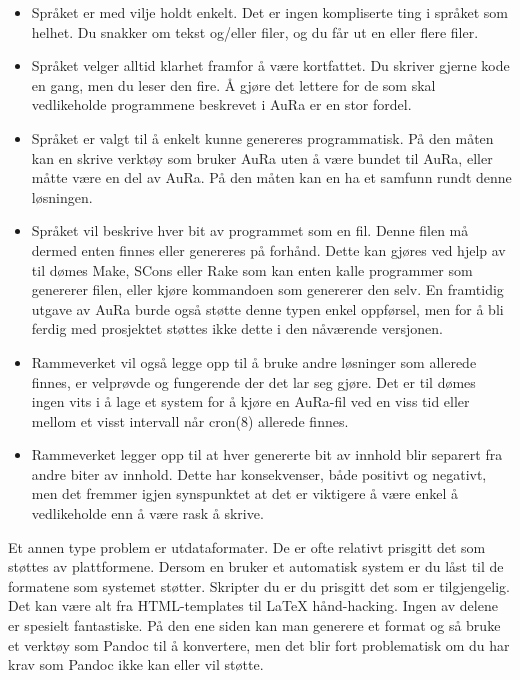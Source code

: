 \documentclass[11pt]{article}
\begin{document}
\begin{itemize}
\item Språket er med vilje holdt enkelt. Det er ingen kompliserte ting i språket som helhet. Du snakker om tekst og/eller filer, og du får ut en eller flere filer.
\item Språket velger alltid klarhet framfor å være kortfattet. Du skriver gjerne kode en gang, men du leser den fire. Å gjøre det lettere for de som skal vedlikeholde programmene beskrevet i AuRa er en stor fordel.
\item Språket er valgt til å enkelt kunne genereres programmatisk. På den måten kan en skrive verktøy som bruker AuRa uten å være bundet til AuRa, eller måtte være en del av AuRa. På den måten kan en ha et samfunn rundt denne løsningen.
\item Språket vil beskrive hver bit av programmet som en fil. Denne filen må dermed enten finnes eller genereres på forhånd. Dette kan gjøres ved hjelp av til dømes Make, SCons eller Rake som kan enten kalle programmer som genererer filen, eller kjøre kommandoen som genererer den selv. En framtidig utgave av AuRa burde også støtte denne typen enkel oppførsel, men for å bli ferdig med prosjektet støttes ikke dette i den nåværende versjonen.
\item Rammeverket vil også legge opp til å bruke andre løsninger som allerede finnes, er velprøvde og fungerende der det lar seg gjøre. Det er til dømes ingen vits i å lage et system for å kjøre en AuRa-fil ved en viss tid eller mellom et visst intervall når cron(8) allerede finnes.
\item Rammeverket legger opp til at hver genererte bit av innhold blir separert fra andre biter av innhold. Dette har konsekvenser, både positivt og negativt, men det fremmer igjen synspunktet at det er viktigere å være enkel å vedlikeholde enn å være rask å skrive.
\end{itemize}




Et annen type problem er utdataformater. De er ofte relativt prisgitt det som støttes av plattformene. Dersom en bruker et automatisk system er du låst til de formatene som systemet støtter. Skripter du er du prisgitt det som er tilgjengelig. Det kan være alt fra HTML-templates til LaTeX hånd-hacking. Ingen av delene er spesielt fantastiske. På den ene siden kan man generere et format og så bruke et verktøy som Pandoc til å konvertere, men det blir fort problematisk om du har krav som Pandoc ikke kan eller vil støtte.
\end{document}
